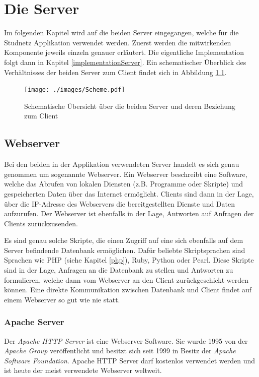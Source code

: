 \documentclass[../main.tex]{subfiles}
\begin{document}
	\chapter{Die Server}
	Im folgenden Kapitel wird auf die beiden Server eingegangen, welche für die Studnetz Applikation verwendet werden. Zuerst werden die mitwirkenden Komponente jeweils einzeln genauer erläutert. Die eigentliche Implementation folgt dann in Kapitel \ref{implementationServer}. Ein schematischer Überblick des Verhältnisses der beiden Server zum Client findet sich in Abbildung \ref{ServerClientSchema}.
	
	\begin{figure} 
		\centering
		\texttt{[image: ./images/Scheme.pdf]}
		\caption{Schematische Übersicht über die beiden Server und deren Beziehung zum Client}
		\label{ServerClientSchema}
	\end{figure}
	
	\section{Webserver}
	Bei den beiden in der Applikation verwendeten Server handelt es sich genau genommen um sogenannte Webserver. Ein Webserver beschreibt eine Software, welche das Abrufen von lokalen Diensten (z.B. Programme oder Skripte) und gespeicherten Daten über das Internet ermöglicht. Clients sind dann in der Lage, über die IP-Adresse des Webservers die bereitgestellten Dienste und Daten aufzurufen. Der Webserver ist ebenfalls in der Lage, Antworten auf Anfragen der Clients zurückzusenden. 
		
	Es sind genau solche Skripte, die einen Zugriff auf eine sich ebenfalls auf dem Server befindende Datenbank ermöglichen. Dafür beliebte Skriptsprachen sind Sprachen wie PHP (siehe Kapitel \ref{php}), Ruby, Python oder Pearl. Diese Skripte sind in der Lage, Anfragen an die Datenbank zu stellen und Antworten zu formulieren, welche dann vom Webserver an den Client zurückgeschickt werden können. Eine direkte Kommunikation zwischen Datenbank und Client findet auf einem Webserver so gut wie nie statt.
	
	\subsection{Apache Server}
	Der \emph{Apache HTTP Server} ist eine Webserver Software. Sie wurde 1995 von der \emph{Apache Group} veröffentlicht und besitzt sich seit 1999 in Besitz der \emph{Apache Software Foundation}. Apache HTTP Server darf kostenlos verwendet werden und ist heute der meist verwendete Webserver weltweit. \cite{apache}
	
\end{document}
